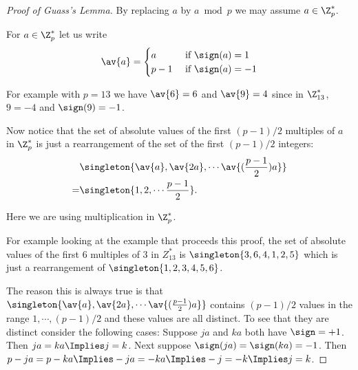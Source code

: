 \documentclass[oneside,12pt]{amsart}
\begin{document}
\begin{proof}[Proof of Guass's Lemma]
By replacing $a$ by $a\bmod p$ we may assume $a\in\Z^*_p$.

For $a\in\Z^*_p$ let us write 
$$\av{a}=
\begin{cases}
a &\text{ if } \sign(a) = 1 \\
p-1 &\text{ if } \sign(a) = -1
\end{cases}
$$

For example with $p=13$ we have $\av{6} = 6$ and $\av{9}=4$ since in $\Z^*_{13}$, $9=-4$ and $\sign(9)=-1$.

Now notice that the set of absolute values of the first $(p-1)/2$ multiples of $a$ in $\Z^*_p$ is just a rearrangement
of the set of the first $(p-1)/2$ integers:
\begin{align*}
&\singleton{\av{a},\av{2a}, \cdots \av{(\frac{p-1}{2})a}} \\
= &\singleton{1,2,\cdots \frac{p-1}{2}}.
\end{align*}

Here we are using multiplication in $\Z^*_p$.

For example looking at the example that proceeds this proof, the set of absolute values of the first 6 multiples
of 3 in $Z^*_{13}$ is $\singleton{3,6,4,1,2,5}$ which is just a rearrangement of $\singleton{1,2,3,4,5,6}$.

The reason this is always true is that $\singleton{\av{a},\av{2a}, \cdots \av{(\frac{p-1}{2})a}}$ contains $(p-1)/2$ values in the
range $1,\cdots, (p-1)/2$ and these values are all distinct. To see that they are distinct consider the following cases:
Suppose $ja$ and $ka$ both have $\sign=+1$. Then $ja=ka\Implies j=k$. Next suppose
$\sign(ja)=\sign(ka)=-1$. Then $p-ja=p-ka \Implies -ja = -ka \Implies -j = -k \Implies j=k $.


\end{proof}




\end{document}
